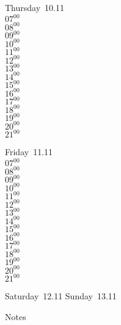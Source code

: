 \documentclass[11pt,a4paper]{book}\usepackage[]{graphicx}\usepackage[]{color}
\begin{document}
\clearpage
\begin{headerbox}
\end{headerbox}
\begin{weekdaybox}
  Thursday~10.11\\
  { 
  \vfill
  $07^{00}$\\
$08^{00}$\\
$09^{00}$\\
$10^{00}$\\
$11^{00}$\\
$12^{00}$\\
$13^{00}$\\
$14^{00}$\\
$15^{00}$\\
$16^{00}$\\
$17^{00}$\\
$18^{00}$\\
$19^{00}$\\
$20^{00}$\\
$21^{00}$\\
  }
\end{weekdaybox} 
\begin{weekdaybox}
  Friday~11.11\\
  { 
  \vfill
  $07^{00}$\\
$08^{00}$\\
$09^{00}$\\
$10^{00}$\\
$11^{00}$\\
$12^{00}$\\
$13^{00}$\\
$14^{00}$\\
$15^{00}$\\
$16^{00}$\\
$17^{00}$\\
$18^{00}$\\
$19^{00}$\\
$20^{00}$\\
$21^{00}$\\
  }
\end{weekdaybox}
\begin{weekendbox}
  Saturday~12.11
  \tcblower
  Sunday~13.11
\end{weekendbox} %
\begin{notebox}
  Notes
\end{notebox}
\clearpage
\end{document}

